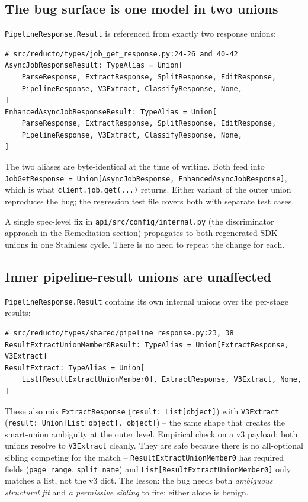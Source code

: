 \documentclass[11pt]{article}
\begin{document}
\subsection{The bug surface is one model in two unions}

\texttt{PipelineResponse.Result} is referenced from exactly two response unions:

\begin{lstlisting}[style=py]
# src/reducto/types/job_get_response.py:24-26 and 40-42
AsyncJobResponseResult: TypeAlias = Union[
    ParseResponse, ExtractResponse, SplitResponse, EditResponse,
    PipelineResponse, V3Extract, ClassifyResponse, None,
]
EnhancedAsyncJobResponseResult: TypeAlias = Union[
    ParseResponse, ExtractResponse, SplitResponse, EditResponse,
    PipelineResponse, V3Extract, ClassifyResponse, None,
]
\end{lstlisting}

The two aliases are byte-identical at the time of writing. Both feed into \texttt{JobGetResponse = Union[AsyncJobResponse, EnhancedAsyncJobResponse]}, which is what \texttt{client.job.get(...)} returns. Either variant of the outer union reproduces the bug; the regression test file covers both with separate test cases.

A single spec-level fix in \texttt{api/src/config/internal.py} (the discriminator approach in the Remediation section) propagates to both regenerated SDK unions in one Stainless cycle. There is no need to repeat the change for each.

\subsection{Inner pipeline-result unions are unaffected}

\texttt{PipelineResponse.Result} contains its own internal unions over the per-stage results:

\begin{lstlisting}[style=py]
# src/reducto/types/shared/pipeline_response.py:23, 38
ResultExtractUnionMember0Result: TypeAlias = Union[ExtractResponse, V3Extract]
ResultExtract: TypeAlias = Union[
    List[ResultExtractUnionMember0], ExtractResponse, V3Extract, None,
]
\end{lstlisting}

These also mix \texttt{ExtractResponse} (\texttt{result: List[object]}) with \texttt{V3Extract} (\texttt{result: Union[List[object], object]}) -- the same shape that creates the smart-union ambiguity at the outer level. Empirical check on a v3 payload: both unions resolve to \texttt{V3Extract} cleanly. They are safe because there is no all-optional sibling competing for the match -- \texttt{ResultExtractUnionMember0} has required fields (\texttt{page\_range}, \texttt{split\_name}) and \texttt{List[ResultExtractUnionMember0]} only matches a list, not the v3 dict. The lesson: the bug needs both \emph{ambiguous structural fit} and \emph{a permissive sibling} to fire; either alone is benign.
\end{document}
